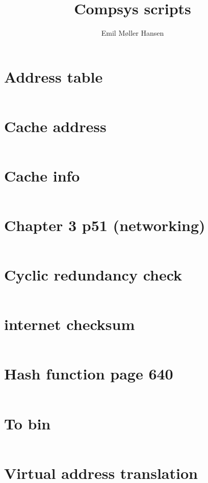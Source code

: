 \documentclass[12pt]{article}
\title{Compsys scripts}
\author{Emil Møller Hansen}
\date{}
\begin{document}
        \maketitle
        \pagestyle{fancy}
        \chead{}
        \lhead{}
        \rhead{}
        \renewcommand{\headrulewidth}{0pt}

        \tableofcontents
        \newpage
        \section{Address table}
        \inputminted{javascript}{../js/addressTable.js}
        \newpage
        \section{Cache address}
        \inputminted{javascript}{../js/cacheAddress.js}
        \newpage
        \section{Cache info}
        \inputminted{javascript}{../js/cacheInfo.js}
        \newpage
        \section{Chapter 3 p51 (networking)}
        \inputminted{javascript}{../js/Ch3P51.js}
        \newpage
        \section{Cyclic redundancy check}
        \inputminted{javascript}{../js/crc.js}
        \newpage
        \section{internet checksum}
        \inputminted{javascript}{../js/internetCheckSum.js}
        \newpage
        \section{Hash function page 640}
        \inputminted{javascript}{../js/sloppyHashPage640.js}
        \newpage
        \section{To bin}
        \inputminted{javascript}{../js/toBin.js}
        \newpage
        \section{Virtual address translation}
        \inputminted{javascript}{../js/VMAddressTranslation.js}
        
\end{document}
